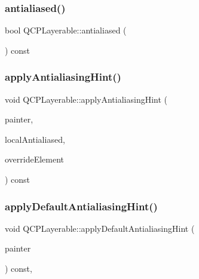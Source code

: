 \subsubsection{\texorpdfstring{antialiased()}{antialiased()}}
{\footnotesize\ttfamily bool Q\+C\+P\+Layerable\+::antialiased (\begin{DoxyParamCaption}{ }\end{DoxyParamCaption}) const\hspace{0.3cm}{\ttfamily [inline]}}

\mbox{\label{class_q_c_p_layerable_acb663e375d2d36dc5c55021ee5a2119b}} 
\subsubsection{\texorpdfstring{applyAntialiasingHint()}{applyAntialiasingHint()}}
{\footnotesize\ttfamily void Q\+C\+P\+Layerable\+::apply\+Antialiasing\+Hint (\begin{DoxyParamCaption}\item[{\mbox{\hyperlink{class_q_c_p_painter}{Q\+C\+P\+Painter}} $\ast$}]{painter,  }\item[{bool}]{local\+Antialiased,  }\item[{\mbox{\hyperlink{namespace_q_c_p_ae55dbe315d41fe80f29ba88100843a0c}{Q\+C\+P\+::\+Antialiased\+Element}}}]{override\+Element }\end{DoxyParamCaption}) const\hspace{0.3cm}{\ttfamily [protected]}}

\mbox{\label{class_q_c_p_layerable_afdf83ddc6a265cbf4c89fe99d3d93473}} 
\subsubsection{\texorpdfstring{applyDefaultAntialiasingHint()}{applyDefaultAntialiasingHint()}}
{\footnotesize\ttfamily void Q\+C\+P\+Layerable\+::apply\+Default\+Antialiasing\+Hint (\begin{DoxyParamCaption}\item[{\mbox{\hyperlink{class_q_c_p_painter}{Q\+C\+P\+Painter}} $\ast$}]{painter }\end{DoxyParamCaption}) const\hspace{0.3cm}{\ttfamily [protected]}, {}}



